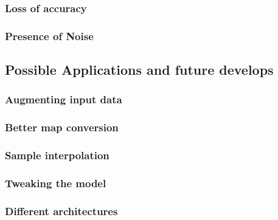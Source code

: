 \subsubsection{Loss of accuracy}
\subsubsection{Presence of Noise}

	
\label{sec:sampling}



\subsection{Possible Applications and future develops}
\subsubsection{Augmenting input data}
\label{sec:data-augmentation}
\subsubsection{Better map conversion}
\subsubsection{Sample interpolation}
\subsubsection{Tweaking the model}
\subsubsection{Different architectures}


